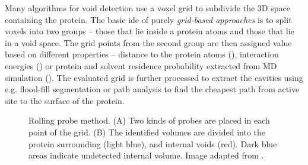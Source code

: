 Many algorithms for void detection use a voxel grid to subdivide the 3D space containing the protein. The basic ide of purely \textit{grid-based approaches} is to split voxels into two groups -- those that lie inside a protein atoms and those that lie in a void space. 
The grid points from the second group are then assigned value based on different properties -- distance to the protein atoms (\cite{levitt1992pocket, Petrek2006Caver, hendlich1997ligsite}), interaction energies (\cite{an2005pocketome, laurie2005q, hernandez2009sitehound}) or protein and solvent residence probability extracted from MD simulation (\cite{raunest2011dxtuber, krone2011interactive, kokh2013trapp, paramo2014efficient}). The evaluated grid is further processed to extract the cavities using e.g. flood-fill segmentation or path analysis to find the cheapest path from active site to the surface of the protein.

\begin{figure}
\vspace{-30pt}
  \begin{center}
  \vspace{-5pt}
  \caption{Rolling probe method. (A) Two kinds of probes are placed in each point of the grid. (B) The identified volumes are divided into the protein surrounding (light blue), and internal voids (red). Dark blue areas indicate undetected internal volume. Image adapted from \cite{brezovsky2013software}.}
  \label{Fig:rollingprobe}  
	\end{center}
  \vspace{-10pt}
\end{figure}

